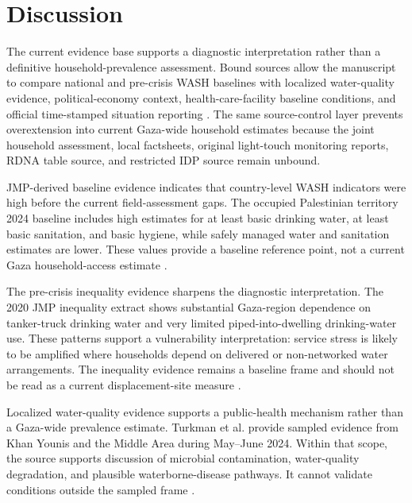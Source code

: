 
\section{Discussion}

The current evidence base supports a diagnostic interpretation rather than a definitive household-prevalence assessment. Bound sources allow the manuscript to compare national and pre-crisis WASH baselines with localized water-quality evidence, political-economy context, health-care-facility baseline conditions, and official time-stamped situation reporting \citep{turkman_2025,fayad_2025,ocha_2026_apr17,ocha_2026_may15,jmp_wash_hh_2025_country,jmp_pse_inequalities_2021,jmp_winhcf_pse_2024}. The same source-control layer prevents overextension into current Gaza-wide household estimates because the joint household assessment, local factsheets, original light-touch monitoring reports, RDNA table source, and restricted IDP source remain unbound.

JMP-derived baseline evidence indicates that country-level WASH indicators were high before the current field-assessment gaps. The occupied Palestinian territory 2024 baseline includes high estimates for at least basic drinking water, at least basic sanitation, and basic hygiene, while safely managed water and sanitation estimates are lower. These values provide a baseline reference point, not a current Gaza household-access estimate \citep{jmp_wash_hh_2025_country,jmp_pse_profile_2025}.

The pre-crisis inequality evidence sharpens the diagnostic interpretation. The 2020 JMP inequality extract shows substantial Gaza-region dependence on tanker-truck drinking water and very limited piped-into-dwelling drinking-water use. These patterns support a vulnerability interpretation: service stress is likely to be amplified where households depend on delivered or non-networked water arrangements. The inequality evidence remains a baseline frame and should not be read as a current displacement-site measure \citep{jmp_pse_inequalities_2021}.

Localized water-quality evidence supports a public-health mechanism rather than a Gaza-wide prevalence estimate. Turkman et al. provide sampled evidence from Khan Younis and the Middle Area during May--June 2024. Within that scope, the source supports discussion of microbial contamination, water-quality degradation, and plausible waterborne-disease pathways. It cannot validate conditions outside the sampled frame \citep{turkman_2025}.


